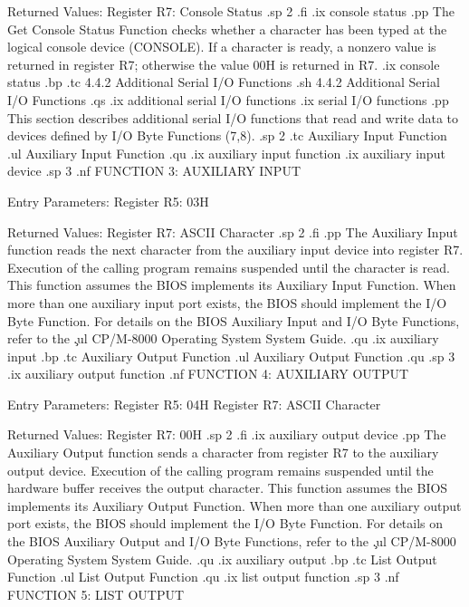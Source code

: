                 Returned  Values:
                   Register   R7:  Console Status
.sp 2
.fi
.ix console status
.pp
The Get Console Status Function checks whether a character has been
typed at the logical console device (CONSOLE). If a character is
ready, a nonzero value is returned in register   R7; otherwise the 
value 00H is returned in   R7. 
.ix console status
.bp
.tc         4.4.2 Additional Serial I/O Functions
.sh
4.4.2  Additional Serial I/O Functions
.qs
.ix additional serial I/O functions
.ix serial I/O functions
.pp
This section describes additional serial I/O functions that read and 
write data to devices defined by I/O Byte Functions (7,8). 
.sp 2
.tc                Auxiliary Input Function
.ul
Auxiliary Input Function
.qu
.ix auxiliary input function
.ix auxiliary input device
.sp 3
.nf
                  FUNCTION 3:  AUXILIARY INPUT

               Entry Parameters:
                  Register   R5:  03H

               Returned  Values:
                  Register   R7:  ASCII Character
.sp 2
.fi
.pp
The Auxiliary Input function reads the next character from the
auxiliary input device into register   R7.  Execution of the 
calling program remains suspended until the character is read. 
This function assumes the BIOS 
implements its Auxiliary Input Function. When more than one 
auxiliary input port exists, the BIOS should implement the 
I/O Byte Function. For details on the 
BIOS Auxiliary Input and I/O Byte Functions, refer
to the \c
.ul
CP/M-8000 Operating System System Guide.
.qu
.ix auxiliary input
.bp
.tc                Auxiliary Output Function
.ul
Auxiliary Output Function
.qu
.sp 3
.ix auxiliary output function
.nf
                  FUNCTION 4:  AUXILIARY OUTPUT

               Entry Parameters:
                  Register   R5:  04H
                  Register   R7:  ASCII Character

               Returned  Values:
                  Register   R7:  00H
.sp 2
.fi
.ix auxiliary output device
.pp
The Auxiliary Output function sends a character from register
  R7 to the auxiliary output device. Execution of the calling 
program remains suspended until the hardware buffer receives the
output character. This function assumes the BIOS 
implements its Auxiliary Output Function. When more than one 
auxiliary output port exists, the BIOS should implement the 
I/O Byte Function. For details on the 
BIOS Auxiliary Output and I/O Byte Functions, refer
to the \c
.ul
CP/M-8000 Operating System System Guide.
.qu
.ix auxiliary output
.bp
.tc                List Output Function
.ul
List Output Function
.qu
.ix list output function
.sp 3
.nf
                    FUNCTION 5:  LIST OUTPUT

